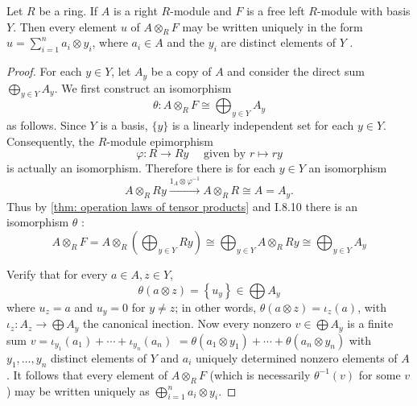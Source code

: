 \begin{theorem}
    Let $R$ be a ring. If $A$ is a right $R$-module and $F$ is a free left $R$-module with basis $Y$.
    Then every element $u$ of ${A} \otimes_{{R}} {F}$ may be written uniquely in the form ${u}=\sum_{i=1}^n {a}_i \otimes {y}_i$, where ${a}_i \in A$ and the ${y}_i$ are distinct elements of $Y$ .
    \begin{proof}
        For each $y \in Y$, let $A_y$ be a copy of $A$ and consider the direct sum $\bigoplus_{y \in Y} A_y$. We first construct an isomorphism
        \begin{equation*}
            \theta: A \otimes_R F \cong \bigoplus_{y \in Y} A_y
        \end{equation*}
        as follows. Since $Y$ is a basis, $\{y\}$ is a linearly independent set for each $y \in Y$. Consequently, the $R$-module epimorphism  \begin{equation*}
            \varphi: R \rightarrow Ry \quad \text{ given by } r \mapsto r y
        \end{equation*}
        is actually an isomorphism. Therefore there is for each $y \in Y$ an isomorphism
        \begin{equation*}
            A \otimes_R R y \xrightarrow{1_A \otimes \varphi^{-1}} A \otimes_R R \cong A=A_y .
        \end{equation*}
        Thus by \ref{thm: operation laws of tensor products} and I.8.10 there is an isomorphism $\theta$ :
        \begin{equation*}
            A \otimes_R F
            =
            A \otimes_R\left(\bigoplus_{y \in Y} R y\right) \cong \bigoplus_{y \in Y} A \otimes_R R y \cong \bigoplus_{y \in Y} A_y
        \end{equation*}

        Verify that for every $a \in A, z \in Y$,
        \begin{equation*}
            \theta(a \otimes z)
            =
            \left\{u_y\right\}
            \in
            \bigoplus A_y
        \end{equation*}
        where $u_z=a$ and $u_y=0$ for $y \neq z$; in other words, $\theta(a \otimes z)=\iota_z(a)$, with $\iota_z: A_z \rightarrow \bigoplus A_y$ the canonical inection. Now every nonzero $v \in \bigoplus A_y$ is a finite sum $v=\iota_{y_1}\left(a_1\right)+\cdots+\iota_{y_n}\left(a_n\right)$ $=\theta\left(a_1 \otimes y_1\right)+\cdots+\theta\left(a_n \otimes y_n\right)$ with $y_1, \ldots, y_n$ distinct elements of $Y$ and $a_i$ uniquely determined nonzero elements of $A$. It follows that every element of $A \otimes_R F$ (which is necessarily $\theta^{-1}(v)$ for some $v$ ) may be written uniquely as $\bigoplus^n_{i=1} a_i \otimes y_i$.
    \end{proof}
\end{theorem}



